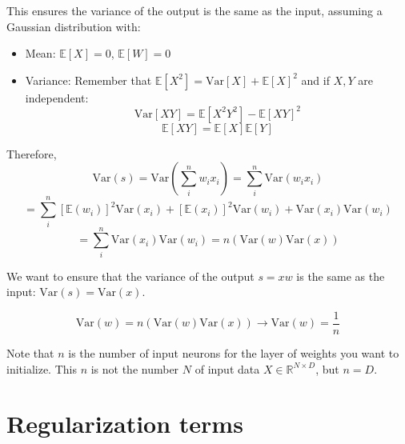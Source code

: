 \documentclass{article}
\begin{document}
This ensures the variance of the output is the same as the input, assuming a Gaussian distribution with:
\begin{itemize}
    \item Mean: $\mathbb{E}[X] = 0$, $\mathbb{E}[W] = 0$
    \item Variance: Remember that $\mathbb{E}[X^2] = \text{Var}[X] + \mathbb{E}[X]^2$ and if $X, Y$ are independent:
    \begin{equation}
    \text{Var}[XY] = \mathbb{E}[X^2 Y^2] - \mathbb{E}[XY]^2
    \end{equation}
    \begin{equation}
    \mathbb{E}[XY] = \mathbb{E}[X]\mathbb{E}[Y]
    \end{equation}
\end{itemize}

Therefore,
\begin{equation}
\text{Var}(s) = \text{Var} \left( \sum_{i}^n w_i x_i \right) = \sum_{i}^n \text{Var} (w_i x_i)
\end{equation}
\begin{equation}
= \sum_{i}^n \left[ \mathbb{E} (w_i) \right]^2 \text{Var} (x_i) + \left[ \mathbb{E} (x_i) \right]^2 \text{Var} (w_i) + \text{Var} (x_i) \text{Var} (w_i)
\end{equation}
\begin{equation}
= \sum_{i}^n \text{Var} (x_i) \text{Var} (w_i) = n (\text{Var} (w) \text{Var} (x))
\end{equation}

We want to ensure that the variance of the output $s = xw$ is the same as the input: $\text{Var}(s) = \text{Var}(x)$.

\begin{equation}
\text{Var} (w) = n (\text{Var} (w) \text{Var} (x)) \rightarrow \text{Var} (w) = \frac{1}{n}
\end{equation}

Note that $n$ is the number of input neurons for the layer of weights you want to initialize. This $n$ is not the number $N$ of input data $X \in \mathbb{R}^{N \times D}$, but $n = D$.
















\section{Regularization terms}
\end{document}
